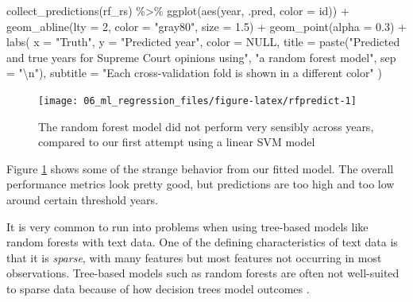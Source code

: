 \documentclass[
]{krantz}
\makeatletter
\newenvironment{Shaded}{\begin{snugshade}}{\end{snugshade}}
\newcommand{\AttributeTok}[1]{\textcolor[rgb]{0.77,0.63,0.00}{#1}}
\newcommand{\ConstantTok}[1]{\textcolor[rgb]{0.00,0.00,0.00}{#1}}
\newcommand{\DecValTok}[1]{\textcolor[rgb]{0.00,0.00,0.81}{#1}}
\newcommand{\FloatTok}[1]{\textcolor[rgb]{0.00,0.00,0.81}{#1}}
\newcommand{\FunctionTok}[1]{\textcolor[rgb]{0.00,0.00,0.00}{#1}}
\newcommand{\NormalTok}[1]{#1}
\newcommand{\SpecialCharTok}[1]{\textcolor[rgb]{0.00,0.00,0.00}{#1}}
\newcommand{\StringTok}[1]{\textcolor[rgb]{0.31,0.60,0.02}{#1}}
\newenvironment{kframe}{%
\medskip{}
\setlength{\fboxsep}{.8em}
 \def\at@end@of@kframe{}%
 \ifinner\ifhmode%
  \def\at@end@of@kframe{\end{minipage}}%
  \begin{minipage}{\columnwidth}%
 \fi\fi%
 \def\FrameCommand##1{\hskip\@totalleftmargin \hskip-\fboxsep
 \colorbox{shadecolor}{##1}\hskip-\fboxsep
     \hskip-\linewidth \hskip-\@totalleftmargin \hskip\columnwidth}%
 \MakeFramed {\advance\hsize-\width
   \@totalleftmargin\z@ \linewidth\hsize
   \@setminipage}}%
 {\par\unskip\endMakeFramed%
 \at@end@of@kframe}
\renewenvironment{Shaded}{\begin{kframe}}{\end{kframe}}
\makeatother
\begin{document}
\begin{Shaded}
\begin{Highlighting}[]
\FunctionTok{collect\_predictions}\NormalTok{(rf\_rs) }\SpecialCharTok{\%\textgreater{}\%}
  \FunctionTok{ggplot}\NormalTok{(}\FunctionTok{aes}\NormalTok{(year, .pred, }\AttributeTok{color =}\NormalTok{ id)) }\SpecialCharTok{+}
  \FunctionTok{geom\_abline}\NormalTok{(}\AttributeTok{lty =} \DecValTok{2}\NormalTok{, }\AttributeTok{color =} \StringTok{"gray80"}\NormalTok{, }\AttributeTok{size =} \FloatTok{1.5}\NormalTok{) }\SpecialCharTok{+}
  \FunctionTok{geom\_point}\NormalTok{(}\AttributeTok{alpha =} \FloatTok{0.3}\NormalTok{) }\SpecialCharTok{+}
  \FunctionTok{labs}\NormalTok{(}
    \AttributeTok{x =} \StringTok{"Truth"}\NormalTok{,}
    \AttributeTok{y =} \StringTok{"Predicted year"}\NormalTok{,}
    \AttributeTok{color =} \ConstantTok{NULL}\NormalTok{,}
    \AttributeTok{title =} \FunctionTok{paste}\NormalTok{(}\StringTok{"Predicted and true years for Supreme Court opinions using"}\NormalTok{,}
                  \StringTok{"a random forest model"}\NormalTok{, }\AttributeTok{sep =} \StringTok{"}\SpecialCharTok{\textbackslash{}n}\StringTok{"}\NormalTok{),}
    \AttributeTok{subtitle =} \StringTok{"Each cross{-}validation fold is shown in a different color"}
\NormalTok{  )}
\end{Highlighting}
\end{Shaded}

\begin{figure}

{\centering \texttt{[image: 06\_ml\_regression\_files/figure-latex/rfpredict-1]} 

}

\caption{The random forest model did not perform very sensibly across years, compared to our first attempt using a linear SVM model}\label{fig:rfpredict}
\end{figure}

Figure \ref{fig:rfpredict} shows some of the strange behavior from our fitted model. The overall performance metrics look pretty good, but predictions are too high and too low around certain threshold years. 

It is very common to run into problems when using tree-based models like random forests with text data. One of the defining characteristics of text data is that it is \emph{sparse}, with many features but most features not occurring in most observations. Tree-based models such as random forests are often not well-suited to sparse data because of how decision trees model outcomes \citep{Tang2018}.
\end{document}
